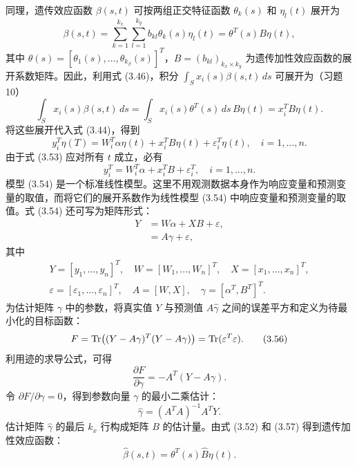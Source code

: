 同理，遗传效应函数 $\beta(s,t)$ 可按两组正交特征函数 $\theta_k(s)$ 和 $\eta_l(t)$ 展开为
\begin{equation}
\beta(s,t)=\sum_{k=1}^{k_x}\sum_{l=1}^{k_y}b_{kl}\theta_k(s)\eta_l(t)
=\theta^T(s)B\eta(t),
\tag{3.52}
\end{equation}
其中 $\theta(s)=[\theta_1(s),\ldots,\theta_{k_\beta}(s)]^T$，$B=(b_{kl})_{k_x\times k_y}$ 为遗传加性效应函数的展开系数矩阵。因此，利用式 (3.46)，积分 $\int_Sx_i(s)\beta(s,t)\,ds$ 可展开为（习题10）
\[
\int_Sx_i(s)\beta(s,t)\,ds
=\int_Sx_i(s)\theta^T(s)\,ds\,B\eta(t)
=x_i^TB\eta(t).
\]
将这些展开代入式 (3.44)，得到
\begin{equation}
y_i^T\eta(T)=W_i^T\alpha\eta(t)+x_i^TB\eta(t)+\varepsilon_i^T\eta(t),
\quad i=1,\ldots,n.
\tag{3.53}
\end{equation}
由于式 (3.53) 应对所有 $t$ 成立，必有
\begin{equation}
y_i^T=W_i^T\alpha+x_i^TB+\varepsilon_i^T,\quad i=1,\ldots,n.
\tag{3.54}
\end{equation}
模型 (3.54) 是一个标准线性模型。这里不用观测数据本身作为响应变量和预测变量的取值，而将它们的展开系数作为线性模型 (3.54) 中响应变量和预测变量的取值。式 (3.54) 还可写为矩阵形式：
\begin{equation}
\begin{aligned}
Y&=W\alpha+XB+\varepsilon,\\
&=A\gamma+\varepsilon,
\end{aligned}
\tag{3.55}
\end{equation}
其中
\[
\begin{gathered}
Y=[y_1,\ldots,y_n]^T,\quad W=[W_1,\ldots,W_n]^T,\quad X=[x_1,\ldots,x_n]^T,\\
\varepsilon=[\varepsilon_1,\ldots,\varepsilon_n]^T,\quad
A=[W,X],\quad \gamma=[\alpha^T,B^T]^T.
\end{gathered}
\]
为估计矩阵 $\gamma$ 中的参数，将真实值 $Y$ 与预测值 $A\hat\gamma$ 之间的误差平方和定义为待最小化的目标函数：
\begin{equation}
F=\operatorname{Tr}\bigl((Y-A\gamma)^T(Y-A\gamma)\bigr)=\operatorname{Tr}(\varepsilon^T\varepsilon).
\tag{3.56}
\end{equation}
利用迹的求导公式，可得
\[
\frac{\partial F}{\partial\gamma}=-A^T(Y-A\gamma).
\]
令 $\partial F/\partial\gamma=0$，得到参数向量 $\gamma$ 的最小二乘估计：
\begin{equation}
\hat\gamma=(A^TA)^{-1}A^TY.
\tag{3.57}
\end{equation}
估计矩阵 $\hat\gamma$ 的最后 $k_x$ 行构成矩阵 $B$ 的估计量。由式 (3.52) 和 (3.57) 得到遗传加性效应函数：
\begin{equation}
\hat\beta(s,t)=\theta^T(s)\hat B\eta(t).
\tag{3.58}
\end{equation}

